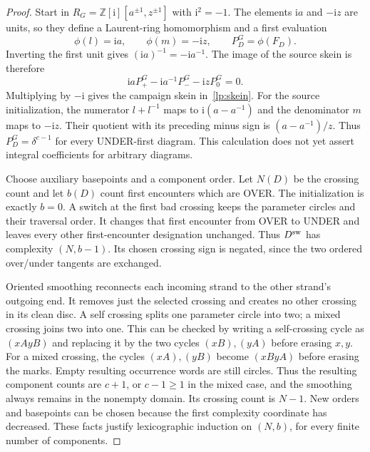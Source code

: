 \begin{proof}
Start in $R_G=\mathbb Z[\mathrm i][a^{\pm1},z^{\pm1}]$ with
$\mathrm i^2=-1$. The elements $\mathrm ia$ and $-\mathrm iz$ are units,
so they define a Laurent-ring homomorphism and a first evaluation
\begin{equation}\label{lp:gaussian}
 \phi(l)=\mathrm ia,\qquad \phi(m)=-\mathrm iz,
 \qquad P_D^G=\phi(F_D).
\end{equation}
Inverting the first unit gives $(\mathrm ia)^{-1}=-\mathrm ia^{-1}$.
The image of the source skein is therefore
\begin{equation}\label{lp:gaussian-skein}
 \mathrm iaP_+^G-\mathrm ia^{-1}P_-^G-\mathrm izP_0^G=0.
\end{equation}
Multiplying by $-\mathrm i$ gives the campaign skein in~\eqref{lp:skein}.
For the source initialization, the numerator $l+l^{-1}$ maps to
$\mathrm i(a-a^{-1})$ and the denominator $m$ maps to $-\mathrm iz$.
Their quotient with its preceding minus sign is $(a-a^{-1})/z$.
Thus $P_D^G=\delta^{c-1}$ for every UNDER-first diagram. This calculation
does not yet assert integral coefficients for arbitrary diagrams.

Choose auxiliary basepoints and a component order. Let $N(D)$ be the
crossing count and let $b(D)$ count first encounters which are OVER.
The initialization is exactly $b=0$. A switch at the first bad crossing
keeps the parameter circles and their traversal order. It changes that
first encounter from OVER to UNDER and leaves every other first-encounter
designation unchanged. Thus $D^{\rm sw}$ has complexity $(N,b-1)$.
Its chosen crossing sign is negated, since the two ordered over/under
tangents are exchanged.

Oriented smoothing reconnects each incoming strand to the other strand's
outgoing end. It removes just the selected crossing and creates no other
crossing in its clean disc. A self crossing splits one parameter circle
into two; a mixed crossing joins two into one. This can be checked by
writing a self-crossing cycle as $(x A y B)$ and replacing it by the
two cycles $(x B),(y A)$ before erasing $x,y$. For a mixed crossing,
the cycles $(x A),(y B)$ become $(x B y A)$ before erasing the marks.
Empty resulting occurrence words are still circles. Thus the resulting
component counts are $c+1$, or $c-1\geq1$ in the mixed case, and the
smoothing always remains in the nonempty domain. Its crossing count is
$N-1$. New orders and basepoints can be chosen because the first
complexity coordinate has decreased. These facts justify lexicographic
induction on $(N,b)$, for every finite number of components.


\end{proof}
